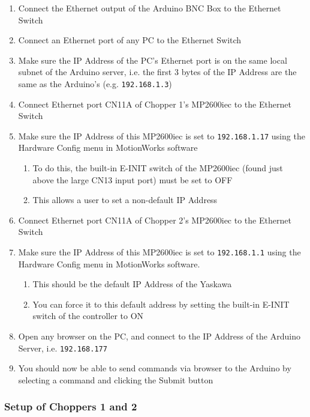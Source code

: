 \documentclass{article}
\begin{document}
        \begin{enumerate}[label=\textbf{\arabic*}]
            \item Connect the Ethernet output of the Arduino BNC Box to the Ethernet Switch
            \item Connect an Ethernet port of any PC to the Ethernet Switch
            \item Make sure the IP Address of the PC’s Ethernet port is on the same local subnet of the 
            Arduino server, i.e. the first 3 bytes of the IP Address are the same as the Arduino’s (e.g.  \texttt{192.168.1.3})
            \item Connect Ethernet port CN11A of Chopper 1’s MP2600iec to the Ethernet Switch
            \item  Make sure the IP Address of this MP2600iec is set to \texttt{192.168.1.17} using the Hardware Config menu in MotionWorks software
            \begin{enumerate}
                \item To do this, the built-in E-INIT switch of the MP2600iec (found just above the large CN13 input port) must be set to OFF
                \item This allows a user to set a non-default IP Address
            \end{enumerate}
            \item Connect Ethernet port CN11A of Chopper 2's MP2600iec to the Ethernet Switch
            \item  Make sure the IP Address of this MP2600iec is set to \texttt{192.168.1.1} using the Hardware Config menu in MotionWorks software.
            \begin{enumerate}
                \item This should be the default IP Address of the Yaskawa
                \item You can force it to this default address by setting the built-in E-INIT switch of the controller to ON
            \end{enumerate}
            \item Open any browser on the PC, and connect to the IP Address of the Arduino Server, i.e.
            \texttt{192.168.177}
            \item You should now be able to send commands via browser to the Arduino by selecting a command and clicking the Submit button
        \end{enumerate}
        
        \subsubsection{Setup of Choppers 1 and 2}
        
\end{document}
